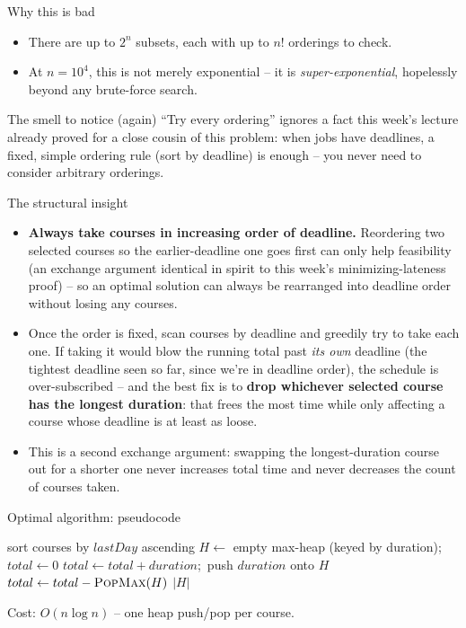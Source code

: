 \documentclass[11pt,aspectratio=169]{beamer}
\begin{document}
\begin{frame}{Why this is bad}
  \begin{itemize}
    \item There are up to $2^n$ subsets, each with up to $n!$ orderings to check.
    \item At $n = 10^4$, this is not merely exponential -- it is
    \emph{super-exponential}, hopelessly beyond any brute-force search.
  \end{itemize}
  \begin{alertblock}{The smell to notice (again)}
    ``Try every ordering'' ignores a fact this week's lecture already proved for a
    close cousin of this problem: when jobs have deadlines, a fixed, simple ordering
    rule (sort by deadline) is enough -- you never need to consider arbitrary
    orderings.
  \end{alertblock}
\end{frame}

\begin{frame}{The structural insight}
  \begin{itemize}
    \item \textbf{Always take courses in increasing order of deadline.} Reordering two
    selected courses so the earlier-deadline one goes first can only help feasibility
    (an exchange argument identical in spirit to this week's minimizing-lateness proof)
    -- so an optimal solution can always be rearranged into deadline order without
    losing any courses.
    \item Once the order is fixed, scan courses by deadline and greedily try to take
    each one. If taking it would blow the running total past \emph{its own} deadline
    (the tightest deadline seen so far, since we're in deadline order), the schedule is
    over-subscribed -- and the best fix is to \textbf{drop whichever selected course
    has the longest duration}: that frees the most time while only affecting a course
    whose deadline is at least as loose.
    \item This is a second exchange argument: swapping the longest-duration course out
    for a shorter one never increases total time and never decreases the count of
    courses taken.
  \end{itemize}
\end{frame}

\begin{frame}{Optimal algorithm: pseudocode}
  \footnotesize
  \begin{algorithmic}[1]
      \State sort courses by $lastDay$ ascending
      \State $H \gets$ empty max-heap (keyed by duration);\ $total \gets 0$
        \State $total \gets total + duration$;\ push $duration$ onto $H$
          \State $total \gets total - \Call{PopMax}{H}$ 
        \EndIf
      \EndFor
      \State \Return $|H|$
    \EndFunction
  \end{algorithmic}
  Cost: $O(n \log n)$ -- one heap push/pop per course.
\end{frame}
\end{document}
